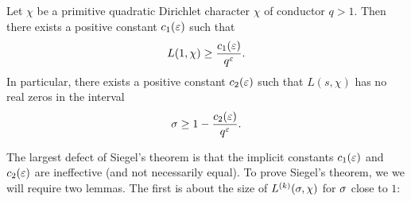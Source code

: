     \begin{theorem*}
      Let $\chi$ be a primitive quadratic Dirichlet character $\chi$ of conductor $q > 1$. Then there exists a positive constant $c_{1}(\varepsilon)$ such that
      \[
        L(1,\chi) \ge \frac{c_{1}(\varepsilon)}{q^{\varepsilon}}.
      \]
      In particular, there exists a positive constant $c_{2}(\varepsilon)$ such that $L(s,\chi)$ has no real zeros in the interval
      \[
        \sigma \ge 1-\frac{c_{2}(\varepsilon)}{q^{\varepsilon}}.
      \]
    \end{theorem*}

    The largest defect of Siegel's theorem is that the implicit constants $c_{1}(\varepsilon)$ and $c_{2}(\varepsilon)$ are ineffective (and not necessarily equal). To prove Siegel's theorem, we we will require two lemmas. The first is about the size of $L^{(k)}(\sigma,\chi)$ for $\sigma$ close to $1$:

